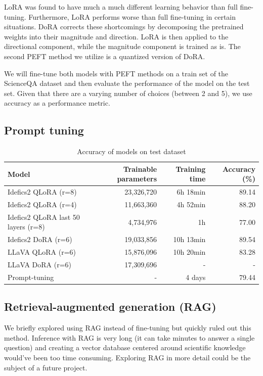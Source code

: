 \documentclass{article}
\begin{document}
LoRA was found to have much a much different learning behavior than full fine-tuning. Furthermore, LoRA performs worse than full fine-tuning in certain situations. DoRA corrects these shortcomings by decomposing the pretrained weights into their magnitude and direction. LoRA is then applied to the directional component, while the magnitude component is trained as is. The second PEFT method we utilize is a quantized version of DoRA.

We will fine-tune both models with PEFT methods on a train set of the ScienceQA dataset and then evaluate the performance of the model on the test set. Given that there are a varying number of choices (between 2 and 5), we use accuracy as a performance metric.

\subsection{Prompt tuning}

\begin{table}[t]
  \centering
  \begin{tabular}{lrrr}
    \hline
    Model & Trainable parameters & Training time & Accuracy (\%)\\ 
    \hline
    Idefics2 QLoRA (r=8) & 23,326,720 & 6h 18min & 89.14\\ 
    Idefics2 QLoRA (r=4) & 11,663,360 & 4h 52min & 88.20\\ 
    Idefics2 QLoRA last 50 layers (r=8) & 4,734,976 & 1h & 77.00\\
    Idefics2 DoRA (r=6) & 19,033,856 & 10h 13min & 89.54\\
    LLaVA QLoRA (r=6) & 15,876,096 & 10h 20min & 83.28\\
    LLaVA DoRA (r=6) & 17,309,696 & - & -\\
    Prompt-tuning & - & 4 days & 79.44\\
    \hline
  \end{tabular}
  \caption{Accuracy of models on test dataset}
  \label{tab:model_performance}
\end{table}

\subsection{Retrieval-augmented generation (RAG)}
We briefly explored using RAG instead of fine-tuning but quickly ruled out this method. Inference with RAG is very long (it can take minutes to answer a single question) and creating a vector database centered around scientific knowledge would've been too time consuming. Exploring RAG in more detail could be the subject of a future project.
\end{document}
